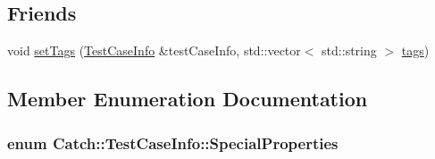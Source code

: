 \subsection*{Friends}
\begin{DoxyCompactItemize}
\item 
void \hyperlink{struct_catch_1_1_test_case_info_a0fe44abaf18ae7c26f98a9fc2b08679c}{set\-Tags} (\hyperlink{struct_catch_1_1_test_case_info}{Test\-Case\-Info} \&test\-Case\-Info, std\-::vector$<$ std\-::string $>$ \hyperlink{struct_catch_1_1_test_case_info_a150a7cbca1dd0c91799ccb14ff822eb0}{tags})
\end{DoxyCompactItemize}


\subsection{Member Enumeration Documentation}
\hypertarget{struct_catch_1_1_test_case_info_a39b232f74b4a7a6f2183b96759027eac}{
\subsubsection[{Special\-Properties}]{\setlength{\rightskip}{0pt plus 5cm}enum {\bf Catch\-::\-Test\-Case\-Info\-::\-Special\-Properties}}}\label{struct_catch_1_1_test_case_info_a39b232f74b4a7a6f2183b96759027eac}
